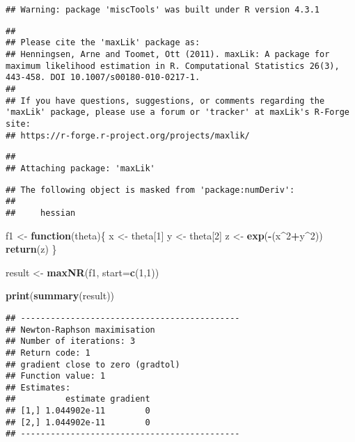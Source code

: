 \documentclass[
]{article}
\newenvironment{Shaded}{\begin{snugshade}}{\end{snugshade}}
\newcommand{\AttributeTok}[1]{\textcolor[rgb]{0.13,0.29,0.53}{#1}}
\newcommand{\ControlFlowTok}[1]{\textcolor[rgb]{0.13,0.29,0.53}{\textbf{#1}}}
\newcommand{\DecValTok}[1]{\textcolor[rgb]{0.00,0.00,0.81}{#1}}
\newcommand{\FunctionTok}[1]{\textcolor[rgb]{0.13,0.29,0.53}{\textbf{#1}}}
\newcommand{\NormalTok}[1]{#1}
\newcommand{\OtherTok}[1]{\textcolor[rgb]{0.56,0.35,0.01}{#1}}
\newcommand{\SpecialCharTok}[1]{\textcolor[rgb]{0.81,0.36,0.00}{\textbf{#1}}}
\begin{document}
\begin{verbatim}
## Warning: package 'miscTools' was built under R version 4.3.1
\end{verbatim}

\begin{verbatim}
## 
## Please cite the 'maxLik' package as:
## Henningsen, Arne and Toomet, Ott (2011). maxLik: A package for maximum likelihood estimation in R. Computational Statistics 26(3), 443-458. DOI 10.1007/s00180-010-0217-1.
## 
## If you have questions, suggestions, or comments regarding the 'maxLik' package, please use a forum or 'tracker' at maxLik's R-Forge site:
## https://r-forge.r-project.org/projects/maxlik/
\end{verbatim}

\begin{verbatim}
## 
## Attaching package: 'maxLik'
\end{verbatim}

\begin{verbatim}
## The following object is masked from 'package:numDeriv':
## 
##     hessian
\end{verbatim}

\begin{Shaded}
\begin{Highlighting}[]
\NormalTok{f1 }\OtherTok{\textless{}{-}} \ControlFlowTok{function}\NormalTok{(theta)\{ }
\NormalTok{x }\OtherTok{\textless{}{-}}\NormalTok{ theta[}\DecValTok{1}\NormalTok{]}
\NormalTok{y }\OtherTok{\textless{}{-}}\NormalTok{ theta[}\DecValTok{2}\NormalTok{]}
\NormalTok{z }\OtherTok{\textless{}{-}} \FunctionTok{exp}\NormalTok{(}\SpecialCharTok{{-}}\NormalTok{(x}\SpecialCharTok{\^{}}\DecValTok{2}\SpecialCharTok{+}\NormalTok{y}\SpecialCharTok{\^{}}\DecValTok{2}\NormalTok{))}
\FunctionTok{return}\NormalTok{(z)}
\NormalTok{\}}

\NormalTok{result }\OtherTok{\textless{}{-}} \FunctionTok{maxNR}\NormalTok{(f1, }\AttributeTok{start=}\FunctionTok{c}\NormalTok{(}\DecValTok{1}\NormalTok{,}\DecValTok{1}\NormalTok{))}

\FunctionTok{print}\NormalTok{(}\FunctionTok{summary}\NormalTok{(result))}
\end{Highlighting}
\end{Shaded}

\begin{verbatim}
## --------------------------------------------
## Newton-Raphson maximisation 
## Number of iterations: 3 
## Return code: 1 
## gradient close to zero (gradtol) 
## Function value: 1 
## Estimates:
##          estimate gradient
## [1,] 1.044902e-11        0
## [2,] 1.044902e-11        0
## --------------------------------------------
\end{verbatim}
\end{document}
